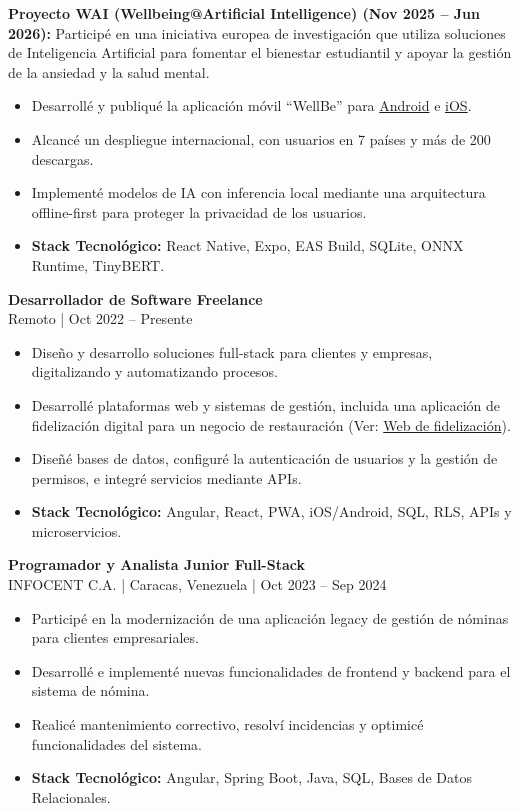\documentclass[10pt,a4paper]{article}
\begin{document}
\vspace{5pt}
\textbf{Proyecto WAI (Wellbeing@Artificial Intelligence) (Nov 2025 -- Jun 2026):} Participé en una iniciativa europea de investigación que utiliza soluciones de Inteligencia Artificial para fomentar el bienestar estudiantil y apoyar la gestión de la ansiedad y la salud mental.
\begin{itemize}
    \item Desarrollé y publiqué la aplicación móvil ``WellBe'' para \href{https://play.google.com/store/apps/details?id=com.caloale.waiv1\&hl=en_US}{Android} e \href{https://apps.apple.com/ie/app/wellbe-journaling-app/id6758772082}{iOS}.
    \item Alcancé un despliegue internacional, con usuarios en 7 países y más de 200 descargas.
    \item Implementé modelos de IA con inferencia local mediante una arquitectura offline-first para proteger la privacidad de los usuarios.
    \item \textbf{Stack Tecnológico:} React Native, Expo, EAS Build, SQLite, ONNX Runtime, TinyBERT.
\end{itemize}

\par\addvspace{\baselineskip}
\textbf{\large Desarrollador de Software Freelance}\\
Remoto | Oct 2022 -- Presente
\begin{itemize}
    \item Diseño y desarrollo soluciones full-stack para clientes y empresas, digitalizando y automatizando procesos.
    \item Desarrollé plataformas web y sistemas de gestión, incluida una aplicación de fidelización digital para un negocio de restauración (Ver: \href{https://avenidakebab.com/}{Web de fidelización}).
    \item Diseñé bases de datos, configuré la autenticación de usuarios y la gestión de permisos, e integré servicios mediante APIs.
    \item \textbf{Stack Tecnológico:} Angular, React, PWA, iOS/Android, SQL, RLS, APIs y microservicios.
\end{itemize}

\par\addvspace{\baselineskip}
\textbf{\large Programador y Analista Junior Full-Stack}\\
INFOCENT C.A. | Caracas, Venezuela | Oct 2023 -- Sep 2024
\begin{itemize}
    \item Participé en la modernización de una aplicación legacy de gestión de nóminas para clientes empresariales.
    \item Desarrollé e implementé nuevas funcionalidades de frontend y backend para el sistema de nómina.
    \item Realicé mantenimiento correctivo, resolví incidencias y optimicé funcionalidades del sistema.
    \item \textbf{Stack Tecnológico:} Angular, Spring Boot, Java, SQL, Bases de Datos Relacionales.
\end{itemize}
\end{document}
